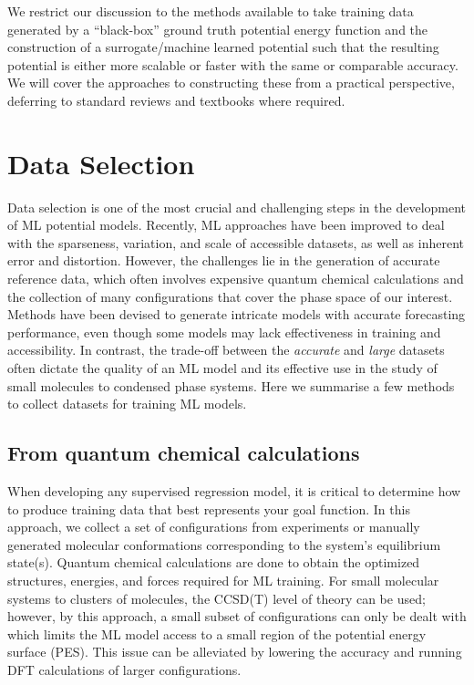\documentclass[9pt,bestpractices]{livecoms}
\begin{document}
We restrict our discussion to the methods available to take training data
generated by a ``black-box'' ground truth potential energy function and the
construction of a surrogate/machine learned potential such that the resulting
potential is either  more scalable or faster with the same or comparable
accuracy. We will cover the approaches to constructing these from a practical
perspective, deferring to standard reviews and textbooks where required.

\section{Data Selection}
Data selection is one of the most crucial and challenging steps in the
development of ML potential models.
Recently, ML approaches have been improved to deal with the sparseness, variation, and scale of accessible datasets, as well as inherent error and distortion. However, the challenges lie in the generation of accurate reference data, which often involves expensive quantum chemical
calculations and the collection of many configurations that cover
the phase space of our interest. Methods have been devised to generate intricate models with accurate forecasting performance, even though some models may lack effectiveness in training and accessibility. In contrast, the trade-off between the {\em accurate} and
{\em large} datasets often dictate the quality of an ML model and its effective
use in the study of small molecules to condensed phase systems. Here we
summarise a few methods to collect datasets for training ML models.


\subsection{From quantum chemical calculations}
When developing any supervised regression model, it is critical to determine how to produce training data that best represents your goal function. In this approach, we collect a set of configurations from experiments or
manually generated molecular conformations corresponding to the system's equilibrium
state(s). Quantum chemical calculations are done to obtain
the optimized structures, energies, and forces required for ML training. For
small molecular systems to clusters of molecules, the CCSD(T) level of theory
can be used; however, by this approach, a small subset of configurations can
only be dealt with which limits the ML model access to a small region of the
potential energy surface (PES). This issue can be alleviated by lowering the accuracy and running DFT
calculations of larger configurations.
\end{document}
